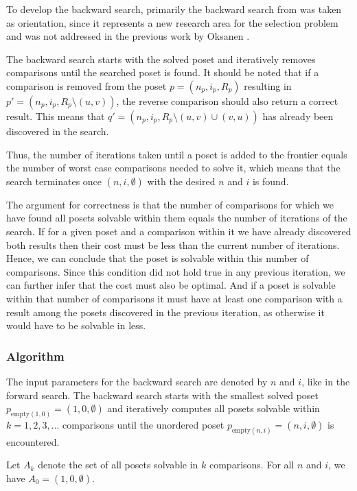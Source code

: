 \documentclass[10pt,journal,compsoc]{IEEEtran}
\begin{document}
To develop the backward search, primarily the backward search from \cite{stober2022lower} was taken as orientation, since it represents a new research area for the selection problem and was not addressed in the previous work by Oksanen \cite{Oksanen}.

The backward search starts with the solved poset and iteratively removes comparisons until the searched poset is found.
It should be noted that if a comparison is removed from the poset $p = (n_p, i_p, R_p)$ resulting in $p' = (n_p, i_p, R_p \setminus (u, v))$, the reverse comparison should also return a correct result.
This means that $q' = (n_p, i_p, R_p \setminus (u, v) \cup (v, u))$ has already been discovered in the search.

Thus, the number of iterations taken until a poset is added to the frontier equals the number of worst case comparisons needed to solve it, which means that the search terminates once $(n, i, \emptyset)$ with the desired $n$ and $i$ is found.

The argument for correctness is that the number of comparisons for which we have found all posets solvable within them equals the number of iterations of the search.
If for a given poset and a comparison within it we have already discovered both results then their cost must be less than the current number of iterations.
Hence, we can conclude that the poset is solvable within this number of comparisons.
Since this condition did not hold true in any previous iteration, we can further infer that the cost must also be optimal.
And if a poset is solvable within that number of comparisons it must have at least one comparison with a result among the posets discovered in the previous iteration, as otherwise it would have to be solvable in less.


\subsubsection{Algorithm} \label{sec:backward:algorithm}
The input parameters for the backward search are denoted by $n$ and $i$, like in the forward search.
The backward search starts with the smallest solved poset $p_{\text{empty} (1, 0)} = (1, 0, \emptyset)$ and iteratively computes all posets solvable within $k = 1, 2, 3, \dots$ comparisons until the unordered poset $p_{\text{empty} (n, i)} = (n, i, \emptyset)$ is encountered.

Let $A_k$ denote the set of all posets solvable in $k$ comparisons.
For all $n$ and $i$, we have $A_0 = { (1, 0, \emptyset) }$.
\end{document}
